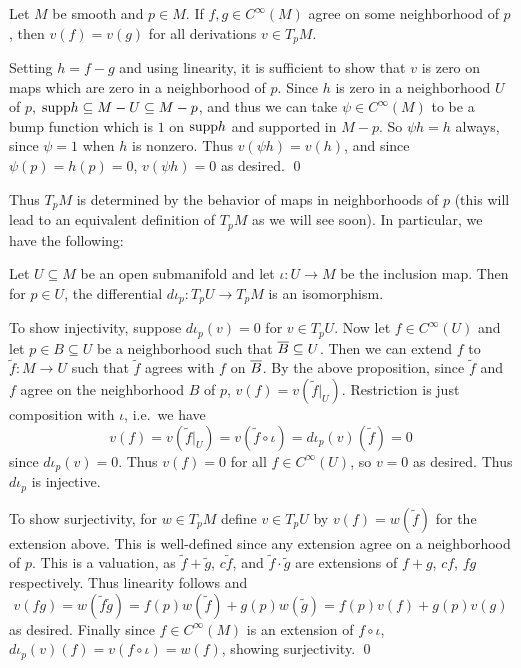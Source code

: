 \bprop

    Let $M$ be smooth and $p\in M$.
    If $f,g\in C^\infty(M)$ agree on some neighborhood of $p$, then $v(f)=v(g)$ for all derivations $v\in T_pM$.

\eprop

\bproof

    Setting $h=f-g$ and using linearity, it is sufficient to show that $v$ is zero on maps which are zero in a neighborhood of $p$.
    Since $h$ is zero in a neighborhood $U$ of $p$, ${\rm supp} h\subseteq M-U\subseteq M-p$, and thus we can take $\psi\in C^\infty(M)$ to be
    a bump function which is $1$ on ${\rm supp} h$ and supported in $M-p$.
    So $\psi h=h$ always, since $\psi=1$ when $h$ is nonzero.
    Thus $v(\psi h)=v(h)$, and since $\psi(p)=h(p)=0$, $v(\psi h)=0$ as desired.
    \qed

\eproof

Thus $T_pM$ is determined by the behavior of maps in neighborhoods of $p$ (this will lead to an equivalent definition of $T_pM$ as we will see soon).
In particular, we have the following:

\bprop

    Let $U\subseteq M$ be an open submanifold and let $\iota\colon U\to M$ be the inclusion map.
    Then for $p\in U$, the differential $d\iota_p\colon T_pU\to T_pM$ is an isomorphism.

\eprop

\bproof

    To show injectivity, suppose $d\iota_p(v)=0$ for $v\in T_pU$.
    Now let $f\in C^\infty(U)$ and let $p\in B\subseteq U$ be a neighborhood such that $\overline B\subseteq U$.
    Then we can extend $f$ to $\tilde f\colon M\to U$ such that $\tilde f$ agrees with $f$ on $\overline B$.
    By the above proposition, since $\tilde f$ and $f$ agree on the neighborhood $B$ of $p$, $v(f)=v(\tilde f|_U)$.
    Restriction is just composition with $\iota$, i.e.\ we have
    $$ v(f) = v(\tilde f|_U) = v(\tilde f\circ\iota) = d\iota_p(v)(\tilde f) = 0 $$
    since $d\iota_p(v)=0$.
    Thus $v(f)=0$ for all $f\in C^\infty(U)$, so $v=0$ as desired.
    Thus $d\iota_p$ is injective.

    To show surjectivity, for $w\in T_pM$ define $v\in T_pU$ by $v(f)=w(\tilde f)$ for the extension above.
    This is well-defined since any extension agree on a neighborhood of $p$.
    This is a valuation, as $\tilde f+\tilde g$, $c\tilde f$, and $\tilde f\cdot\tilde g$ are extensions of $f+g$, $cf$, $fg$ respectively.
    Thus linearity follows and
    $$ v(fg) = w(\tilde f\tilde g) = f(p)w(\tilde f) + g(p)w(\tilde g) = f(p)v(f) + g(p)v(g) $$
    as desired.
    Finally since $f\in C^\infty(M)$ is an extension of $f\circ\iota$, $d\iota_p(v)(f)=v(f\circ\iota)=w(f)$, showing surjectivity.
    \qed

